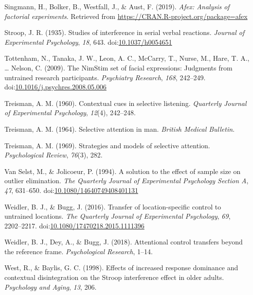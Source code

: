 \documentclass[english,,man,floatsintext]{apa6}
\begin{document}
\leavevmode\hypertarget{ref-r_afex_2019}{}%
Singmann, H., Bolker, B., Westfall, J., \& Aust, F. (2019). \emph{Afex: Analysis of factorial experiments}. Retrieved from \url{https://CRAN.R-project.org/package=afex}

\leavevmode\hypertarget{ref-stroop_studies_1935}{}%
Stroop, J. R. (1935). Studies of interference in serial verbal reactions. \emph{Journal of Experimental Psychology}, \emph{18}, 643. doi:\href{https://doi.org/10.1037/h0054651}{10.1037/h0054651}

\leavevmode\hypertarget{ref-tottenham_nimstim_2009}{}%
Tottenham, N., Tanaka, J. W., Leon, A. C., McCarry, T., Nurse, M., Hare, T. A., \ldots{} Nelson, C. (2009). The NimStim set of facial expressions: Judgments from untrained research participants. \emph{Psychiatry Research}, \emph{168}, 242--249. doi:\href{https://doi.org/10.1016/j.psychres.2008.05.006}{10.1016/j.psychres.2008.05.006}

\leavevmode\hypertarget{ref-treisman_contextual_1960}{}%
Treisman, A. M. (1960). Contextual cues in selective listening. \emph{Quarterly Journal of Experimental Psychology}, \emph{12}(4), 242--248.

\leavevmode\hypertarget{ref-treisman_selective_1964}{}%
Treisman, A. M. (1964). Selective attention in man. \emph{British Medical Bulletin}.

\leavevmode\hypertarget{ref-treisman_strategies_1969}{}%
Treisman, A. M. (1969). Strategies and models of selective attention. \emph{Psychological Review}, \emph{76}(3), 282.

\leavevmode\hypertarget{ref-van_selst_solution_1994}{}%
Van Selst, M., \& Jolicoeur, P. (1994). A solution to the effect of sample size on outlier elimination. \emph{The Quarterly Journal of Experimental Psychology Section A}, \emph{47}, 631--650. doi:\href{https://doi.org/10.1080/14640749408401131}{10.1080/14640749408401131}

\leavevmode\hypertarget{ref-weidler_transfer_2016}{}%
Weidler, B. J., \& Bugg, J. (2016). Transfer of location-specific control to untrained locations. \emph{The Quarterly Journal of Experimental Psychology}, \emph{69}, 2202--2217. doi:\href{https://doi.org/10.1080/17470218.2015.1111396}{10.1080/17470218.2015.1111396}

\leavevmode\hypertarget{ref-weidler_attentional_2018}{}%
Weidler, B. J., Dey, A., \& Bugg, J. (2018). Attentional control transfers beyond the reference frame. \emph{Psychological Research}, 1--14.

\leavevmode\hypertarget{ref-west_effects_1998}{}%
West, R., \& Baylis, G. C. (1998). Effects of increased response dominance and contextual disintegration on the Stroop interference effect in older adults. \emph{Psychology and Aging}, \emph{13}, 206.
\end{document}
